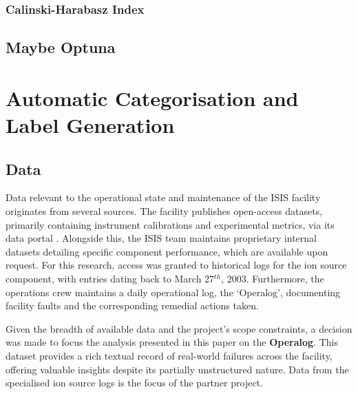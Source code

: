 \documentclass[10pt,oneside]{report}
\begin{document}
\subsection{Calinski-Harabasz Index}

\section{Maybe Optuna}

\chapter{Automatic Categorisation and Label Generation}\label{chap:Methodology}

\section{Data}

Data relevant to the operational state and maintenance of the ISIS facility originates from several sources. The facility publishes open-access datasets, primarily containing instrument calibrations and experimental metrics, via its data portal \citep{isisdata}. Alongside this, the ISIS team maintains proprietary internal datasets detailing specific component performance, which are available upon request. For this research, access was granted to historical logs for the ion source component, with entries dating back to March 27$^{th}$, 2003. Furthermore, the operations crew maintains a daily operational log, the `Operalog', documenting facility faults and the corresponding remedial actions taken.

Given the breadth of available data and the project's scope constraints, a decision was made to focus the analysis presented in this paper on the \textbf{Operalog}. This dataset provides a rich textual record of real-world failures across the facility, offering valuable insights despite its partially unstructured nature. Data from the specialised ion source logs is the focus of the partner project. 
\end{document}
